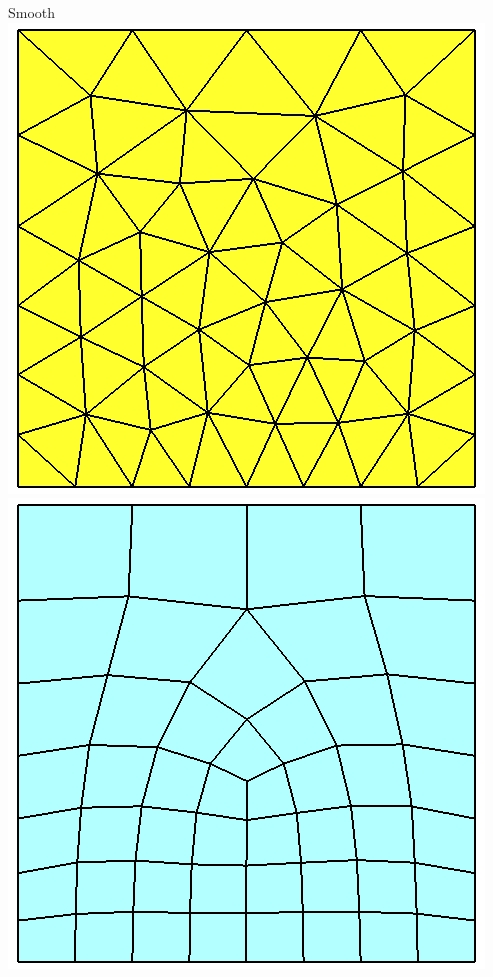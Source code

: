 \documentclass[pdftex,cig,slideColor]{pp4slides}
\begin{document}
  \hfill
  \begin{minipage}{4in}
    \begin{center}
      Smooth\\
      \includegraphics[scale=0.4]{figs/tri3_smooth}\\
      \includegraphics[scale=0.4]{figs/quad4_smooth}
    \end{center}  
  \end{minipage}
\end{document}
